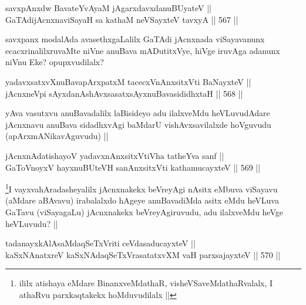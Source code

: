 
\begin{shl}
savxpAnxdw BavateYvAyaM jAgarxdavxdanuBUyateV || \\
GaTAdijAcnxnaviSayaH sa kathaM neVSayxteV tavxyA ||  567 ||  
\end{shl}

\begin{artha}
savxpanx modalAda avasethxgaLalilx GaTAdi jAcnxnada viSayavanunx ecacxrinalilxruvaMte niVne anuBava mADutitxVye, hiVge iruvAga adanunx niVnu Eke? opupxvudilalx?
\end{artha}


\begin{shl}
yadavxsatxvXnuBavapArxpatxM tacecxVnAnxsitxVti BaNayxteV || \\
jAcnxneV\s pi sAyxdanAshAvxsasatxsAyxnuBavasididhxtaH ||  568 ||  
\end{shl}

\begin{artha}
yAva vasutxvu anuBavadalilx laBisideyo adu ilalxveMdu heVLuvudAdare jAcnxnavu anuBava sidadhxvAgi baMdarU vishAvxsavilalxde hoVguvudu (apArxmANikavAguvudu) ||
\end{artha}


\begin{shl}
jAcnxnAdatishayoV yadavxnAnxsitxVtiVha tatheYva sanf || \\
GaToV\s noyxV hayxnuBUteVH sanAnxsitxVti kathamucayxteV ||  569 ||  
\end{shl}

\begin{artha}
\footnote{ililx atishaya eMdare BinanxveMdathaR, visheVSaveMdathaRvalalx, I athaRvu parxkaqtakekx hoMduvudilalx ||}I vayxvahAradasheyalilx jAcnxnakekx beVreyAgi nAsitx eMbuva viSayavu (aMdare aBAvavu) irabalalxdo hAgeye anuBavadiMda asitx eMdu heVLuva GaTavu (viSayagaLu) jAcnxnakekx beVreyAgiruvudu, adu ilalxveMdu heVge heVLuvudu? ||
\end{artha}

\begin{shl}
tadanayxkAlAsaMdaqSeTxVriti ceVdasaducayxteV || \\
kaSxNAnatxreV kaSxNAdaqSeTxVrasatatxvXM vaH parxsajayxteV ||  570 ||  
\end{shl}


